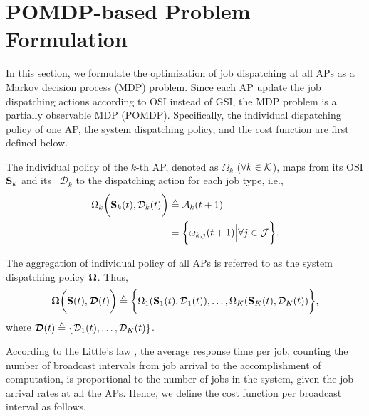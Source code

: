 \section{POMDP-based Problem Formulation}
\label{sec:formulation}
In this section, we formulate the optimization of job dispatching at all APs as a Markov decision process (MDP) problem.
Since each AP update the job dispatching actions according to OSI instead of GSI, the MDP problem is a partially observable MDP (POMDP).
Specifically, the individual dispatching policy of one AP, the system dispatching policy, and the cost function are first defined below.

\begin{definition}
    The individual policy of the $k$-th AP, denoted as $\Omega_{k}$ ($\forall k \in\mathcal{K}$), maps from its OSI $\mathbf{S}_{k}$ and its \brlatency~$\mathcal{D}_{k}$ to the dispatching action for each job type, i.e.,
    \begin{align}
        \Omega_{k} \bigg( \mathbf{S}_{k}(t), \mathcal{D}_{k}(t) \bigg)
        &\triangleq \mathcal{A}_{k}(t+1)
        \nonumber\\
        &= \bigg\{
            \omega_{k,j}(t+1) \Big| \forall j\in\mathcal{J}
        \bigg\}.
        \label{def:action}
    \end{align}

    The aggregation of individual policy of all APs is referred to as the system dispatching policy $\boldsymbol{\Omega}$.
    Thus,
    {\small
    \begin{align}
        \boldsymbol{\Omega}\bigg( \mathbf{S}(t), \boldsymbol{\mathcal{D}}(t) \bigg) \triangleq \bigg\{
            \Omega_{1}(\mathbf{S}_{1}(t), \mathcal{D}_{1}(t)), \dots, \Omega_{K}(\mathbf{S}_{K}(t),\mathcal{D}_{K}(t))
        \bigg\},
    \end{align}
    }
    where $\boldsymbol{\mathcal{D}}(t) \triangleq \{ \mathcal{D}_{1}(t), \dots, \mathcal{D}_{K}(t) \}$.
\end{definition}

According to the Little's law \cite{Little1961}, the average response time per job, counting the number of broadcast intervals from job arrival to the accomplishment of computation, is proportional to the number of jobs in the system, given the job arrival rates at all the APs.
Hence, we define the cost function per broadcast interval as follows.

